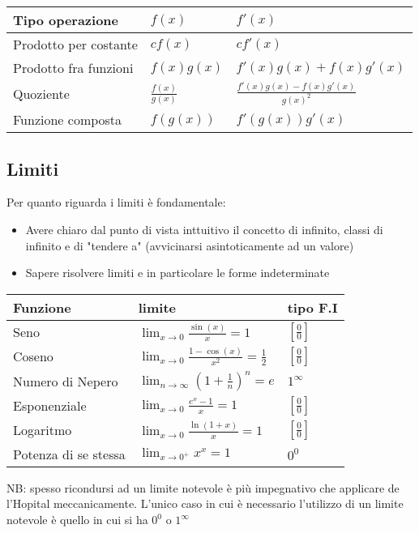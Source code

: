 \renewcommand{\arraystretch}{1.4}
\begin{center}
	\begin{tabular}{l l l}
		\hline
		Tipo operazione       & $ f\left(x\right) $    & $f '(x)$                                  \\
		\hline
		Prodotto per costante & $  cf(x) $             & $ cf'(x) $                                \\
		Prodotto fra funzioni & $  f(x)g(x) $          & $  f'(x)g(x) + f(x)g'(x) $                \\
		Quoziente             & $  \frac{f(x)}{g(x)} $ & $  \frac{f'(x)g(x) - f(x)g'(x)}{g(x)^2} $ \\
		Funzione composta     & $  f(g(x)) $           & $  f'(g(x))g'(x) $                        \\
		\hline
	\end{tabular}
\end{center}

\renewcommand{\arraystretch}{1}
\subsection{Limiti}
Per quanto riguarda i limiti è fondamentale:
\begin{itemize}
	\item Avere chiaro dal punto di vista inttuitivo il concetto di infinito, classi di infinito e di "tendere a" (avvicinarsi asintoticamente ad un valore)
	\item Sapere risolvere limiti e in particolare le forme indeterminate
\end{itemize}

\renewcommand{\arraystretch}{1.4}
\begin{center}
	\begin{tabular}{l l l}
		\hline
		Funzione             & limite                                                     & tipo F.I          \\
		\hline
		Seno                 & $ \lim_{x \to 0} \frac{\sin(x)}{x} = 1 $                   & $ [\frac{0}{0}] $ \\
		Coseno               & $ \lim_{x \to 0} \frac{1-\cos(x)}{x^2} = \frac{1}{2} $     & $ [\frac{0}{0}] $ \\
		Numero di Nepero     & $ \lim_{n \to \infty} \left(1 + \frac{1}{n}\right)^n = e $ & $ 1^{\infty } $   \\
		Esponenziale         & $ \lim_{x \to 0} \frac{e^x - 1}{x} = 1 $                   & $ [\frac{0}{0}] $ \\
		Logaritmo            & $ \lim_{x \to 0} \frac{\ln(1+x)}{x} = 1 $                  & $ [\frac{0}{0}] $ \\
		Potenza di se stessa & $ \lim_{x \to 0^+} x^x = 1 $                               & $ 0^{0} $         \\
		\hline
	\end{tabular}
\end{center}
\renewcommand{\arraystretch}{1}
NB: spesso ricondursi ad un limite notevole è più impegnativo che applicare de l'Hopital meccanicamente. L'unico caso in cui è necessario l'utilizzo di un limite notevole è quello in cui si ha $ 0^{0} $ o $ 1^{\infty } $

